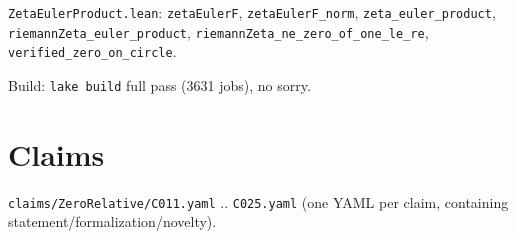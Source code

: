 \documentclass[11pt]{article}
\theoremstyle{remark}
\begin{document}
\texttt{ZetaEulerProduct.lean}: \texttt{zetaEulerF},
\texttt{zetaEulerF\_norm}, \texttt{zeta\_euler\_product},
\texttt{riemannZeta\_euler\_product},
\texttt{riemannZeta\_ne\_zero\_of\_one\_le\_re},
\texttt{verified\_zero\_on\_circle}.

Build: \texttt{lake build} full pass (3631 jobs), no sorry.

\section{Claims}

\texttt{claims/ZeroRelative/C011.yaml} .. \texttt{C025.yaml} (one YAML per
claim, containing statement/formalization/novelty).
\end{document}
